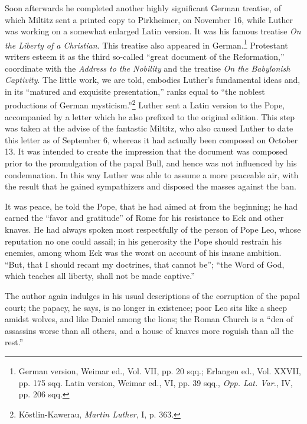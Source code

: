 Soon afterwards he completed another highly significant German
treatise, of which Miltitz sent a printed copy to Pirkheimer, on November
16, while Luther was working on a somewhat enlarged Latin
version. It was his famous treatise \textit{On the Liberty of a Christian}.
This treatise also appeared in German.\footnote
{German version, Weimar ed., Vol. VII, pp. 20 sqq.; Erlangen ed., Vol. XXVII, pp.
175 sqq. Latin version, Weimar ed., VI, pp. 39 sqq., \textit{Opp. Lat. Var.}, IV, pp. 206 sqq.}
Protestant writers esteem
it as the third so-called “great document of the Reformation,” coordinate
with the \textit{Address to the Nobility} and the treatise \textit{On the
Babylonish Captivity}. The little work, we are told, embodies Luther’s fundamental
ideas and, in its “matured and exquisite presentation,”
ranks equal to “the noblest productions of German mysticism.”\footnote{Köstlin-Kawerau, \textit{Martin Luther}, I, p. 363.}
Luther sent a Latin version to the Pope, accompanied by a
letter which he also prefixed to the original edition. This step was
taken at the advise of the fantastic Miltitz, who also caused Luther
to date this letter as of September 6, whereas it had actually been composed
on October 13. It was intended to create the impression that
the document was composed prior to the promulgation of the papal
Bull, and hence was not influenced by his condemnation. In this way
Luther was able to assume a more peaceable air, with the result that
he gained sympathizers and disposed the masses against the ban.

It was peace, he told the Pope, that he had aimed at from the beginning;
he had earned the “favor and gratitude” of Rome for his resistance to Eck
and other knaves. He had always spoken most respectfully of the person of
Pope Leo, whose reputation no one could assail; in his generosity the Pope
should restrain his enemies, among whom Eck was the worst on account of
his insane ambition. “But, that I should recant my doctrines, that cannot
be”; “the Word of God, which teaches all liberty, shall not be made captive.”

The author again indulges in his usual descriptions of the corruption of
the papal court; the papacy, he says, is no longer in existence; poor Leo sits
like a sheep amidst wolves, and like Daniel among the lions; the Roman
Church is a “den of assassins worse than all others, and a house of knaves
more roguish than all the rest.”


